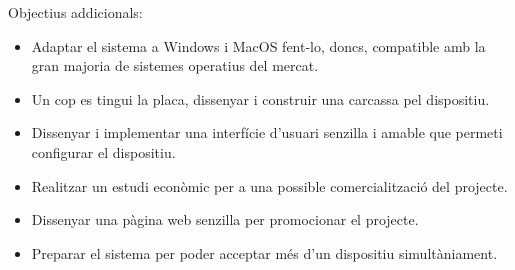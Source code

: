 Objectius addicionals:
\begin{itemize}
    \item Adaptar el sistema a Windows i MacOS fent-lo, doncs, compatible amb la
    gran majoria de sistemes operatius del mercat.
    \item Un cop es tingui la placa, dissenyar i construir una carcassa pel
    dispositiu.
    \item Dissenyar i implementar una interfície d'usuari senzilla i amable
    que permeti configurar el dispositiu.
    \item Realitzar un estudi econòmic per a una possible comercialització del
    projecte.
    \item Dissenyar una pàgina web senzilla per promocionar el projecte.
    \item Preparar el sistema per poder acceptar més d'un dispositiu
    simultàniament.
\end{itemize}
